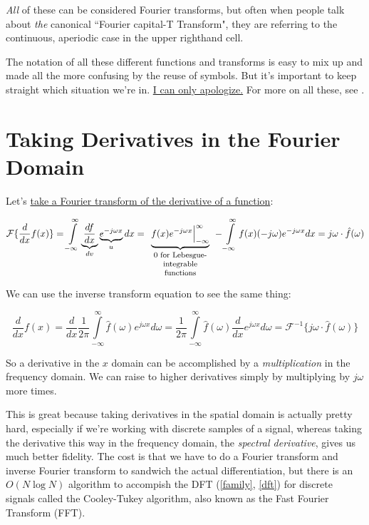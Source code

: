 \documentclass[10pt]{article}
\begin{document}
\textit{All} of these can be considered Fourier transforms, but often when people talk about \textit{the} canonical ``Fourier capital-T Transform", they are referring to the continuous, aperiodic case in the upper righthand cell.

The notation of all these different functions and transforms is easy to mix up and made all the more confusing by the reuse of symbols. But it's important to keep straight which situation we're in. \href{https://www.youtube.com/watch?v=6ITWKtTYlEI&t=69s}{I can only apologize.} For more on all these, see \cite{oppenheim}.

\section{Taking Derivatives in the Fourier Domain}\label{derivative}

Let's \href{https://www.youtube.com/watch?v=d5d0ORQHNYs}{take a Fourier transform of the derivative of a function}\cite{brunton}:

$$\mathcal{F}\{\frac{d}{dx} f(x)\} = \int\limits_{-\infty}^{\infty} \underbrace{\frac{df}{dx}}_{dv} \underbrace{e^{-j \omega x}}_{u} dx = \underbrace{f(x) e^{-j \omega x} \Big|_{-\infty}^{\infty}}_{\parbox{25mm}{\footnotesize \centering 0 for Lebesgue-integrable functions}} - \int\limits_{-\infty}^{\infty} f(x) (-j \omega) e^{-j \omega x} dx = j \omega \cdot \hat{f}(\omega)$$

We can use the inverse transform equation to see the same thing:

$$\frac{d}{dx} f(x) = \frac{d}{dx} \frac{1}{2\pi} \int\limits_{-\infty}^{\infty} \hat{f}(\omega) e^{j \omega x} d \omega = \frac{1}{2\pi} \int\limits_{-\infty}^{\infty} \hat{f}(\omega) \frac{d}{dx} e^{j \omega x} d \omega = \mathcal{F}^{-1}\{j \omega \cdot \hat{f}(\omega)\}$$

So a derivative in the $x$ domain can be accomplished by a \textit{multiplication} in the frequency domain. We can raise to higher derivatives simply by multiplying by $j \omega$ more times.

This is great because taking derivatives in the spatial domain is actually pretty hard, especially if we're working with discrete samples of a signal, whereas taking the derivative this way in the frequency domain, the \textit{spectral derivative}, gives us much better fidelity.\cite{trefethen4}\cite{kutz} The cost is that we have to do a Fourier transform and inverse Fourier transform to sandwich the actual differentiation, but there is an $O(N \log N)$ algorithm to accompish the DFT (\autoref{family}, \autoref{dft}) for discrete signals called the Cooley-Tukey algorithm, also known as the Fast Fourier Transform (FFT)\cite{kutz}.
\end{document}
